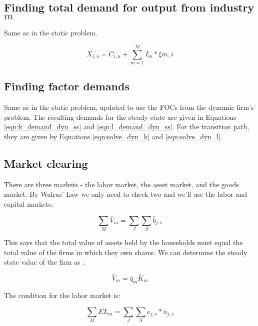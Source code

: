 \documentclass[letterpaper,12pt]{article}
\theoremstyle{definition}
\begin{document}
\begin{spacing}{1.5}
\subsection*{Finding total demand for output from industry $m$}

Same as in the static problem.

\begin{equation}
\label{eqn:output_demand_dyn}
X_{i,u} = C_{i,u} + \sum_{m=1}^{M}I_{m}*\xi{m,i}
\end{equation}

\subsection*{Finding factor demands}

Same as in the static problem, updated to use the FOCs from the dynamic firm's problem.  The resulting demands for the steady state are given in Equations \ref{eqn:k_demand_dyn_ss} and \ref{eqn:l_demand_dyn_ss}.  For the transition path, they are given by Equations \ref{eqn:solve_dyn_k} and \ref{eqn:solve_dyn_l}.


\subsection*{Market clearing}

There are three markets - the labor market, the asset market, and the goods market.  By Walras' Law we only need to check two and we'll use the labor and capital markets:

\begin{equation}
\sum_{M} \bar{V}_{m} = \sum_{J}\sum_{S}\bar{b}_{j,s}
\end{equation}

\noindent\noindent This says that the total value of assets held by the households must equal the total value of the firms in which they own shares. We can determine the steady state value of the firm as :

\begin{equation}
\label{eqn:solve_firm_value_ss}
\bar{V}_{m} =\bar{q}_{m}\bar{K}_{m}
\end{equation}

The condition for the labor market is: 

\begin{equation}
\sum_{M} \overline{EL}_{m} = \sum_{J}\sum_{S}e_{j,s}*\bar{n}_{j,s}
\end{equation}


\end{spacing}
\end{document}
